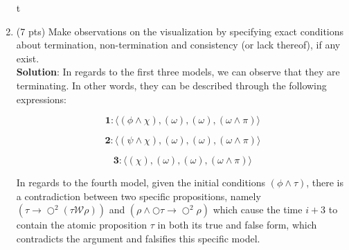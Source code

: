 \documentclass[12pt]{article}
\begin{document}
\begin{spacing}{1.5}
\begin{enumerate}
\begin{center}
		      	t

		      \end{center}

		\item (7 pts) Make observations on the visualization by specifying exact conditions about termination, non-termination and consistency (or lack thereof), if any exist.\\
		      		      		      		      		      		      
		      \textbf{Solution}: In regards to the first three models, we can observe that they are terminating. In other words, they can be described through the following expressions:
		      		      		      		      		      		      
		      $$\textbf{1}: \langle (\phi \land \chi), (\omega), (\omega), (\omega \land \pi) \rangle$$
		      		      		      		      		      		      
		      $$\textbf{2}: \langle (\psi \land \chi), (\omega),(\omega),(\omega \land \pi) \rangle$$
		      		      		      		      		      		      
		      $$\textbf{3}: \langle (\chi), (\omega),(\omega),(\omega \land \pi) \rangle $$
		      		      		      		      		      		      
		      In regards to the fourth model, given the initial conditions $(\phi \land \tau)$, there is a contradiction between two specific propositions, namely $(\tau \rightarrow \bigcirc^2(\tau \mathcal{W} \rho))$ and $(\rho \land \bigcirc \tau \rightarrow \bigcirc^2 \rho)$ which cause the time $i+3$ to contain the atomic proposition $\tau$ in both its true and false form, which contradicts the argument and falsifies this specific model.\\
		      		      		      		      		      		                      

\end{enumerate}
\end{spacing}
\end{document}

